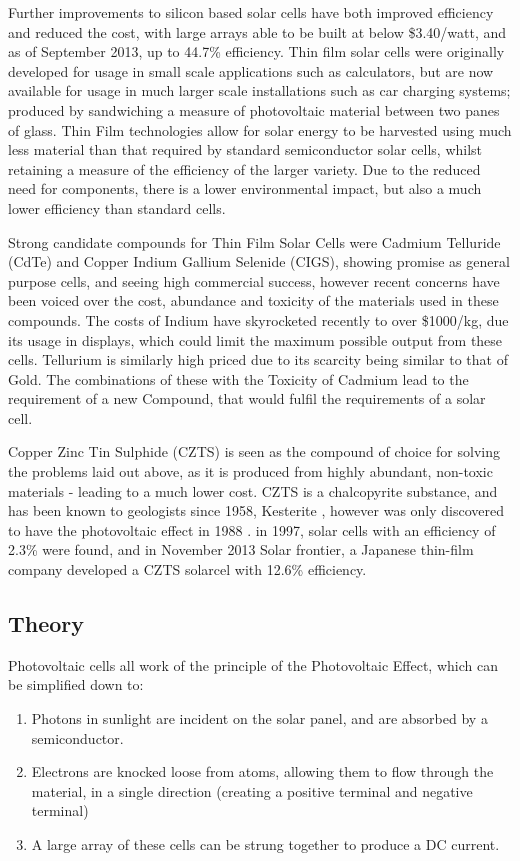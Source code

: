 Further improvements to silicon based solar cells have both improved efficiency and reduced the cost, with large arrays able to be built at below \$3.40/watt\citep{Fraunhofer-Gesellschaft2014}, and as of September 2013, up to 44.7\% efficiency.\citep{Ausick2014} Thin film solar cells were originally developed for usage in small scale applications such as calculators, but are now available for usage in much larger scale installations such as car charging systems; produced by sandwiching a measure of photovoltaic material between two panes of glass. Thin Film technologies allow for solar energy to be harvested using much less material than that required by standard semiconductor solar cells, whilst retaining a measure of the efficiency of the larger variety. Due to the reduced need for components, there is a lower environmental impact, but also a much lower efficiency than standard cells.

Strong candidate compounds for Thin Film Solar Cells were Cadmium Telluride (CdTe) and Copper Indium Gallium Selenide (CIGS), showing promise as general purpose cells, and seeing high commercial success, however recent concerns have been voiced over the cost, abundance and toxicity of the materials used in these compounds. The costs of Indium have skyrocketed recently to over \$1000/kg, due its usage in displays, which could limit the maximum possible output from these cells. Tellurium is similarly high priced due to its scarcity being similar to that of Gold. The combinations of these with the Toxicity of Cadmium lead to the requirement of a new Compound, that would fulfil the requirements of a solar cell.

Copper Zinc Tin Sulphide (CZTS) is seen as the compound of choice for solving the problems laid out above, as it is produced from highly abundant, non-toxic materials - leading to a much lower cost.\citep{Wadia2009} CZTS is a chalcopyrite substance, and has been known to geologists since 1958, Kesterite \citep{WebMineral2014}, however was only discovered to have the photovoltaic effect in 1988 \citep{Ito1988}. in 1997, solar cells with an efficiency of 2.3\% were found, and in November 2013 Solar frontier, a Japanese thin-film company developed a CZTS solarcel with 12.6\% efficiency.\citep{Wang2013}

\subsection{Theory}
	Photovoltaic cells all work of the principle of the Photovoltaic Effect, which can be simplified down to:

	\begin{enumerate}
	\item Photons in sunlight are incident on the solar panel, and are absorbed by a semiconductor.
	\item Electrons are knocked loose from atoms, allowing them to flow through the material, in a single direction (creating a positive terminal and negative terminal)
	\item A large array of these cells can be strung together to produce a DC current.
	\end{enumerate}
